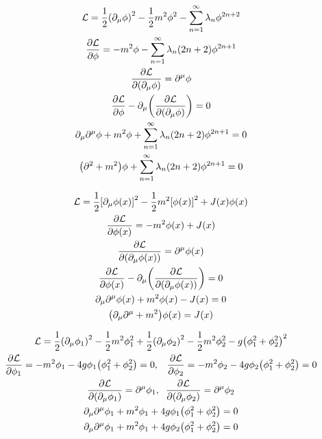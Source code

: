 \documentclass{report}
\theoremstyle{definition}
\begin{document}
\begin{chapter7}
	\begin{gather*}
		\mathcal{L} = \frac{1}{2}\pqty{\partial_{\mu}\phi}^2 - \frac{1}{2}m^2\phi^2 - \sum_{n=1}^{\infty}\lambda_n \phi^{2n+2}\\
		\pdv{\mathcal{L}}{\phi} = -m^2\phi - \sum_{n=1}^{\infty}\lambda_n \pqty{2n+2}\phi^{2n+1} \\
		\pdv{\mathcal{L}}{\pqty{\partial_{\mu}\phi}} = \partial^{\mu}\phi \\
		\pdv{\mathcal{L}}{\phi}-\partial_{\mu}\pqty{\pdv{\mathcal{L}}{\pqty{\partial_{\mu}\phi}}} = 0 \\
		\partial_{\mu}\partial^{\mu}\phi + m^2\phi + \sum_{n=1}^{\infty}\lambda_n \pqty{2n+2}\phi^{2n+1} = 0 \\
		\pqty{\partial^2 + m^2}\phi + \sum_{n=1}^{\infty}\lambda_n \pqty{2n+2}\phi^{2n+1} = 0
	\end{gather*}
\end{chapter7}

\begin{chapter7}
	\begin{gather*}
		\mathcal{L} = \frac{1}{2}\bqty{\partial_{\mu}\phi(x)}^2 - \frac{1}{2}m^2\bqty{\phi(x)}^2 + J(x)\phi(x)\\
		\pdv{\mathcal{L}}{\phi(x)} = -m^2\phi(x) +J(x) \\
		\pdv{\mathcal{L}}{\pqty{\partial_{\mu}\phi(x)}} = \partial^{\mu}\phi(x) \\
		\pdv{\mathcal{L}}{\phi(x)}-\partial_{\mu}\pqty{\pdv{\mathcal{L}}{\pqty{\partial_{\mu}\phi(x)}}} = 0 \\
		\partial_{\mu}\partial^{\mu}\phi(x) + m^2\phi(x) - J(x) = 0 \\
		\pqty{\partial_{\mu}\partial^{\mu} + m^2}\phi(x) = J(x)
	\end{gather*}
\end{chapter7}

\begin{chapter7}
	\begin{gather*}
		\mathcal{L} = \frac{1}{2}\pqty{\partial_{\mu}\phi_1}^2 - \frac{1}{2}m^2\phi_1^2 + \frac{1}{2}\pqty{\partial_{\mu}\phi_2}^2 - \frac{1}{2}m^2\phi_2^2 - g\pqty{\phi_1^2 + \phi_2^2}^2 \\
		\pdv{\mathcal{L}}{\phi_1} = -m^2\phi_1 - 4g\phi_1\pqty{\phi_1^2 + \phi_2^2} = 0, \;\;\; \pdv{\mathcal{L}}{\phi_2} = -m^2\phi_2 - 4g\phi_2\pqty{\phi_1^2 + \phi_2^2} = 0 \\
		\pdv{\mathcal{L}}{\pqty{\partial_{\mu}\phi_1}} = \partial^{\mu}\phi_1, \;\; \pdv{\mathcal{L}}{\pqty{\partial_{\mu}\phi_2}} = \partial^{\mu}\phi_2 \\	
		\partial_{\mu}\partial^{\mu}\phi_1 + m^2\phi_1 + 4g\phi_1\pqty{\phi_1^2 + \phi_2^2} = 0 \\
		\partial_{\mu}\partial^{\mu}\phi_1 + m^2\phi_1 + 4g\phi_2\pqty{\phi_1^2 + \phi_2^2} = 0
	\end{gather*}
\end{chapter7}
\end{document}
